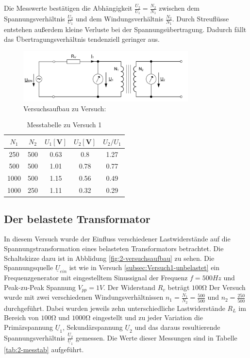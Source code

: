 \documentclass[a4paper]{article}
\begin{document}
Die Messwerte bestätigen die Abhängigkeit $\frac{U_2}{U_1}=\frac{N_2}{N_1}$ zwischen dem Spannungsverhältnis $\frac{U_2}{U_1}$ und dem Windungsverhältnis $\frac{N_2}{N_1}$. Durch Streuflüsse entstehen außerdem kleine Verluste bei der Spannungsübertragung. Dadurch fällt das Übertragungsverhältnis tendenziell geringer aus.


\begin{figure}[H]
    \centering
    \includegraphics[width=0.8\textwidth]{versuchsaufbau-1.png}
    \caption[Schaltplan]{Versuchsaufbau zu Versuch: }
    \label{fig:1-versuchsaufbau}
\end{figure}

\begin{table}[H]
    \centering
    \begin{tabular}{S S S S S}
         \toprule
        {$N_1$} & {$N_2$} & {$U_1 [\textbf{V}]$} & {$U_2 [\textbf{V}]$} & {$U_2/U_1$} \\ 
         & 500 & 0.63 & 0.8 & 1.27\\
        500 & 500 & 1.01 & 0.78  & 0.77\\
        1000 & 500 & 1.15 & 0.56 & 0.49\\
        1000 & 250 & 1.11 & 0.32 & 0.29\\
        \bottomrule
    \end{tabular}
    \caption{Messtabelle zu Versuch 1}
    \label{tab:1-messtab}
\end{table}

\subsection{Der belastete Transformator}
\label{subsec:Versuch2-belastet}
In diesem Versuch wurde der Einfluss verschiedener Lastwiderstände auf die Spannungstransformation eines belasteten Transformators betrachtet.
Die Schaltskizze dazu ist in Abblidung \ref{fig:2-versuchsaufbau} zu sehen. Die Spannungsquelle $\underline{U}_\textit{ein}$ ist wie in Versuch \ref{subsec:Versuch1-unbelastet} \glqq {}\grqq ein Frequenzgenerator mit eingestelltem Sinussignal der Frequenz $f=500\si{Hz}$ und Peak-zu-Peak Spannung $V_\textit{pp}=1\si{V}$. Der Widerstand $R_v$ beträgt $100\si{\ohm}$
Der Versuch wurde mit zwei verschiedenen Windungsverhältnissen $n_1=\frac{N_1}{N_2}=\frac{500}{500}$ und $n_2=\frac{250}{500}$ durchgeführt.
Dabei wurden jeweils zehn unterschiedliche Lastwiderstände $R_L$ im Bereich von $100\si{\ohm}$ und $1000\si{\ohm}$ eingestellt und zu jeder Variation die Primärspannung $\underline{U}_1$, Sekundärspannung $\underline{U}_2$ und das daraus resultierende Spannungsverhältnis $\frac{\underline{U}_2}{\underline{U}_1}$ gemessen. Die Werte dieser Messungen sind in Tabelle \ref{tab:2-messtab} aufgeführt. 
\end{document}
